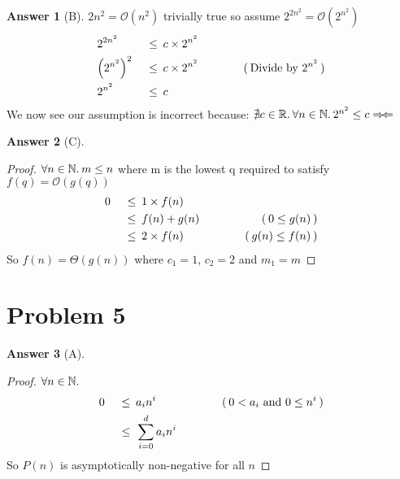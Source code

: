 \documentclass{article}
\theoremstyle{definition}
\newtheorem*{answer}{Answer}
\newcommand{\evidence}[1]{\ensuremath{\hspace{3em} (\hspace{0.2em} \text{#1} \hspace{0.2em})}}
\newcommand{\asymptotic}[3]{\ensuremath{#2 = #1(#3)}}
\newcommand{\bigO}[2]{\asymptotic{\mathcal{O}}{#1}{#2}}
\newcommand{\bigTheta}[2]{\asymptotic{\Theta}{#1}{#2}}
\newcommand{\relation}[1]{\ensuremath{\hspace{0.2em} {{} #1 {}} \hspace{0.2em}}}
\newcommand{\lesseq}{\relation{\le}}
\newcommand{\parens}[1]{\left(#1\right)}
\newcommand{\quantify}[2]{\ensuremath{\forall #1 \in \mathbb{#2}. \hspace{0.2em}}}
\newcommand{\contra}{\ensuremath{\Rightarrow\!\Leftarrow}}
\begin{document}
\begin{answer}[B]
  $\bigO{2n^2}{n^2}$ trivially true so assume $\bigO{2^{2n^2}}{2^{n^2}}$
  \begin{alignat*}{4}
      & 2^{2n^2}             & \lesseq & c \times 2^{n^2}                    & {} \\
      & {\parens{2^{n^2}}}^2 & \lesseq & c \times 2^{n^2}                    & \evidence{Divide by $2^{n^2}$} \\
      & 2^{n^2}              & \lesseq & c                                  & {}
  \end{alignat*}
  We now see our assumption is incorrect because:
  $\nexists c \in \mathbb{R}. \hspace{0.2em} \quantify{n}{N} 2^{n^2} \le c \hfill \contra$
\end{answer}

\begin{answer}[C]
  
  \hfill
  \begin{proof}
    $\quantify{n}{N} m \le n$ where m is the lowest q required to satisfy $\bigO{f(q)}{g(q)}$
    \begin{alignat*}{4}
      & 0  & \lesseq & 1 \times f(n)          & {} \\
      & {} & \lesseq & f(n) + g(n)   & \evidence{$0 \le g(n)$} \\
      & {} & \lesseq & 2 \times f(n) & \evidence{$g(n) \le f(n)$}
    \end{alignat*}
    So $\bigTheta{f(n)}{g(n)}$ where $c_1 = 1$, $c_2 = 2$ and $m_1 = m$ \qedhere
  \end{proof}
\end{answer}



\section*{Problem 5}

\begin{answer}[A]
  \hfill
  \begin{proof}
    $\quantify{n}{N}$
    \begin{alignat*}{4}
      & 0  & \lesseq & a_i n^{i}                & \evidence{$0 < a_i$ and $0 \le n^{i}$} \\
      & {} & \lesseq & \sum_{i=0}^{d}{a_i n^{i}} & {}
    \end{alignat*}
    So $P(n)$ is asymptotically non-negative for all $n$ \qedhere
  \end{proof}
\end{answer}
\end{document}
